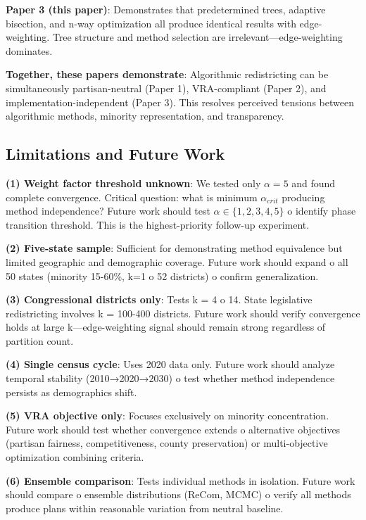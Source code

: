\textbf{Paper 3 (this paper)}: Demonstrates that predetermined trees, adaptive bisection, and n-way optimization all produce identical results with edge-weighting. Tree structure and method selection are irrelevant—edge-weighting dominates.

\textbf{Together, these papers demonstrate}: Algorithmic redistricting can be simultaneously partisan-neutral (Paper 1), VRA-compliant (Paper 2), and implementation-independent (Paper 3). This resolves perceived tensions between algorithmic methods, minority representation, and transparency.

\subsection{Limitations and Future Work}

\textbf{(1) Weight factor threshold unknown}: We tested only $\alpha = 5$ and found complete convergence. Critical question: what is minimum $\alpha_{crit}$ producing method independence? Future work should test $\alpha \in \{1, 2, 3, 4, 5\}$ 	o identify phase transition threshold. This is the highest-priority follow-up experiment.

\textbf{(2) Five-state sample}: Sufficient for demonstrating method equivalence but limited geographic and demographic coverage. Future work should expand 	o all 50 states (minority 15-60\%, k=1 	o 52 districts) 	o confirm generalization.

\textbf{(3) Congressional districts only}: Tests k = 4 	o 14. State legislative redistricting involves k = 100-400 districts. Future work should verify convergence holds at large k—edge-weighting signal should remain strong regardless of partition count.

\textbf{(4) Single census cycle}: Uses 2020 data only. Future work should analyze temporal stability (2010→2020→2030) 	o test whether method independence persists as demographics shift.

\textbf{(5) VRA objective only}: Focuses exclusively on minority concentration. Future work should test whether convergence extends 	o alternative objectives (partisan fairness, competitiveness, county preservation) or multi-objective optimization combining criteria.

\textbf{(6) Ensemble comparison}: Tests individual methods in isolation. Future work should compare 	o ensemble distributions (ReCom, MCMC) 	o verify all methods produce plans within reasonable variation from neutral baseline.

